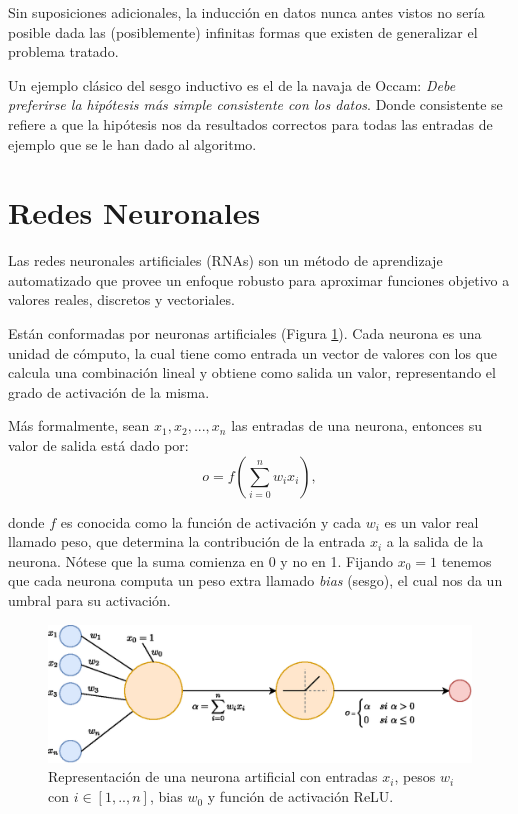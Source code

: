 \documentclass[spanish]{report}
\begin{document}
Sin suposiciones adicionales, la inducción en datos nunca antes vistos no sería posible dada las (posiblemente) infinitas formas que existen de generalizar el problema tratado.

Un ejemplo clásico del sesgo inductivo es el de la navaja de Occam: \textit{Debe preferirse la hipótesis más simple consistente con los datos}. Donde consistente se refiere a que la hipótesis nos da resultados correctos para todas las entradas de ejemplo que se le han dado al algoritmo.

\newpage


\section{Redes Neuronales}

Las redes neuronales artificiales (RNAs)\cite{Mitchell97a} son un método de aprendizaje automatizado que provee un enfoque robusto para aproximar funciones objetivo a valores reales, discretos y vectoriales. 

Están conformadas por neuronas artificiales (Figura \ref{fig:neurona_artificial}). Cada neurona es una unidad de cómputo, la cual tiene como entrada un vector de valores con los que calcula una combinación lineal y obtiene como salida un valor, representando el grado de activación de la misma. 

Más formalmente, sean $x_1, x_2, ..., x_n$ las entradas de una neurona, entonces su valor de salida está dado por:\begin{equation}
o = f(\sum_{i=0}^{n}{w_i x_i}),
\end{equation}

\noindent donde $f$ es conocida como la función de activación y cada $w_i$ es un valor real llamado peso, que determina la contribución de la entrada $x_i$ a la salida de la neurona. Nótese que la suma comienza en 0 y no en 1. Fijando $x_0=1$ tenemos que cada neurona computa un peso extra llamado \textit{bias} (sesgo), el cual nos da un umbral para su activación. 

\begin{figure}[H]
\centering
 \includegraphics[width=\linewidth]{neurona.eps}
 \caption{Representación de una neurona artificial con entradas $x_i$, pesos $w_i$ con $i \in [1, .., n]$, bias $w_0$ y función de activación ReLU.}
 \label{fig:neurona_artificial}
\end{figure}
\end{document}
